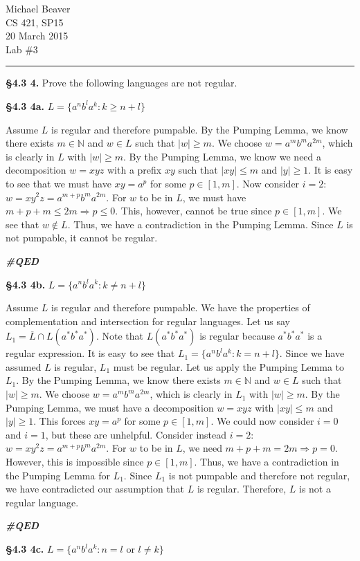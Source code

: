 \documentclass[12pt,letter]{article}
\newcommand{\QED}{
	\begin{flushright}
		\textit{\textbf{\#QED}}
	\end{flushright}
}
\begin{document}
Michael Beaver\\
CS 421, SP15\\
20 March 2015 \\
Lab \#3 
\hrule

\textbf{\S 4.3 4.} Prove the following languages are not regular.

\textbf{\S 4.3 4a.} $L = \{ a^n b^l a^k : k \geq n + l \}$

Assume $L$ is regular and therefore pumpable. By the Pumping Lemma, we know there exists $m \in \mathbb{N}$ and $w \in L$ such that $|w| \geq m$. We choose $w = a^m b^m a^{2m}$, which is clearly in $L$ with $|w| \geq m$. By the Pumping Lemma, we know we need a decomposition $w = xyz$ with a prefix $xy$ such that $|xy| \leq m$ and $|y| \geq 1$. It is easy to see that we must have $xy = a^p$ for some $p \in [1, m]$. Now consider $i = 2$: $w = xy^2 z = a^{m+p} b^m a^{2m}$. For $w$ to be in $L$, we must have $m + p + m \leq 2m \Rightarrow p \leq 0$. This, however, cannot be true since $p \in [1, m]$. We see that $w \not\in L$. Thus, we have a contradiction in the Pumping Lemma. Since $L$ is not pumpable, it cannot be regular. \QED

\textbf{\S 4.3 4b.} $L = \{ a^n b^l a^k : k \neq n + l \}$

Assume $L$ is regular and therefore pumpable. We have the properties of complementation and intersection for regular languages. Let us say $L_1 = \overline{L} \cap L(a^* b^* a^*)$. Note that $L(a^* b^* a^*)$ is regular because $a^* b^* a^*$ is a regular expression. It is easy to see that $L_1 = \{a^n b^l a^k : k = n + l \}$. Since we have assumed $L$ is regular, $L_1$ must be regular. Let us apply the Pumping Lemma to $L_1$. By the Pumping Lemma, we know there exists $m \in \mathbb{N}$ and $w \in L$ such that $|w| \geq m$. We choose $w = a^m b^m a^{2m}$, which is clearly in $L_1$ with $|w| \geq m$. By the Pumping Lemma, we must have a decomposition $w = xyz$ with $|xy| \leq m$ and $|y| \geq 1$. This forces $xy = a^p$ for some $p \in [1, m]$. We could now consider $i = 0$ and $i = 1$, but these are unhelpful. Consider instead $i = 2$: $w = xy^2 z = a^{m + p} b^m a^{2m}$. For $w$ to be in $L$, we need $m + p + m = 2m \Rightarrow p = 0$. However, this is impossible since $p \in [1, m]$. Thus, we have a contradiction in the Pumping Lemma for $L_1$. Since $L_1$ is not pumpable and therefore not regular, we have contradicted our assumption that $L$ is regular. Therefore, $L$ is not a regular language. \QED

\textbf{\S 4.3 4c.} $L = \{ a^n b^l a^k : n = l $ or $l \neq k \}$
\end{document}
